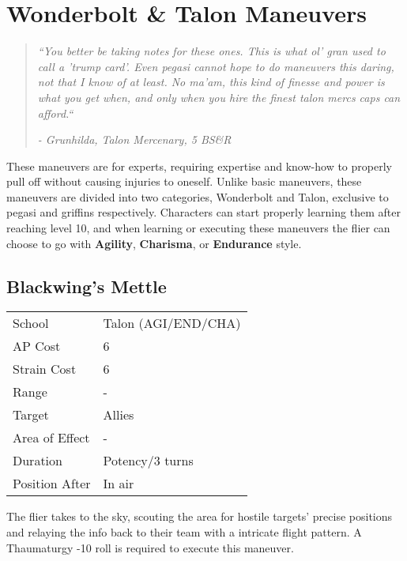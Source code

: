 \documentclass[11pt,a4paper,twocolumn]{book}
\begin{document}
\vfill



\section*{Wonderbolt \& Talon Maneuvers}
\begin{quote}
	\emph{``You better be taking notes for these ones. This is what ol' gran used to call a 'trump card'. Even pegasi cannot hope to do maneuvers this daring, not that I know of at least. No ma'am, this kind of finesse and power is what you get when, and only when you hire the finest talon mercs caps can afford.``}
	
	\emph{- Grunhilda, Talon Mercenary, 5 BS\&R}
\end{quote}

These maneuvers are for experts, requiring expertise and know-how to properly pull off without causing injuries to oneself. Unlike basic maneuvers, these maneuvers are divided into two categories, Wonderbolt and Talon, exclusive to pegasi and griffins respectively. Characters can start properly learning them after reaching level 10, and when learning or executing these maneuvers the flier can choose to go with \textbf{Agility}, \textbf{Charisma}, or \textbf{Endurance} style.

\vfill
\subsection*{Blackwing's Mettle}
{
	\begin{tabu} to 75mm{| X[l,4] | X[l,7] |}
		\hline
		School 			& Talon (AGI/END/CHA) 			\\
		AP Cost	      	& 6 				\\
		Strain Cost     & 6 				\\
		Range     		& - 				\\
		Target      	& Allies 			\\
		Area of Effect  & - 	 			\\
		Duration     	& Potency/3 turns 	 \\
		Position After  & In air 			\\ \hline
	\end{tabu}
	
}

\medskip

The flier takes to the sky, scouting the area for hostile targets' precise positions and relaying the info back to their team with a intricate flight pattern. A Thaumaturgy -10 roll is required to execute this maneuver.
\end{document}
